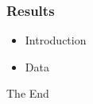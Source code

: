 \documentclass{beamer}
\begin{document}
\begin{frame}

\frametitle{Results}
\begin{itemize}
\item Introduction
\item Data
\end{itemize}

\end{frame}



\begin{frame}
\Huge{\centerline{The End}}
\end{frame}

\end{document}
